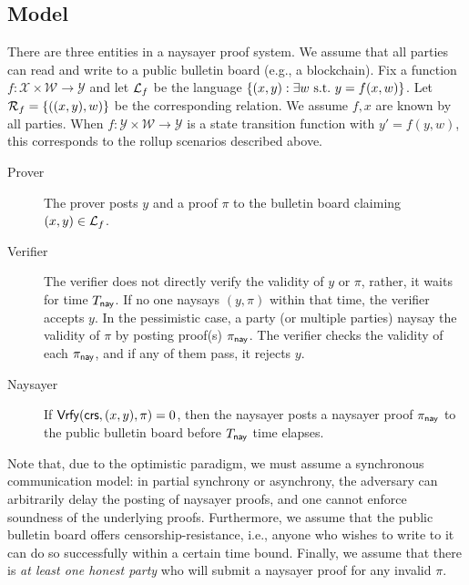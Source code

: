 \subsection{Model}\label{sec:naysayer_model}

There are three entities in a naysayer proof system. We assume that all parties can read and write to a public bulletin board (e.g., a blockchain). Fix a function $f: \mathcal{X} \times \mathcal{W} \to \mathcal{Y}$ and let $\mathcal{L}_f$ be the language $\{(x, y): \exists w \mathrm{~s.t.~} y = f(x, w)\}$. Let $\mathcal{R}_f = \{((x, y), w)\}$ be the corresponding relation. We assume $f,x$ are known by all parties. When $f : \mathcal{Y} \times \mathcal{W} \to \mathcal{Y}$ is a state transition function with $y' = f(y, w)$, this corresponds to the rollup scenarios described above.
\begin{description}
    \item[Prover] The prover posts $y$ and a proof $\pi$ to the bulletin board claiming $(x,y) \in \mathcal{L}_f$. 
    \item[Verifier] The verifier does not directly verify the validity of $y$ or $\pi$, rather, it waits for time $T_{\mathsf{nay}}$.
    If no one naysays $(y, \pi)$ within that time, the verifier accepts $y$. In the pessimistic case, a party (or multiple parties) naysay the validity of $\pi$ by posting proof(s) $\pi_{\mathsf{nay}}$. The verifier checks the validity of each $\pi_{\mathsf{nay}}$, and if any of them pass, it rejects $y$.
    \item[Naysayer] If $\mathsf{Vrfy}(\mathsf{crs}, (x,y),\pi)=0$, then the naysayer posts a naysayer proof $\pi_{\mathsf{nay}}$ to the public bulletin board before $T_{\mathsf{nay}}$ time elapses.
\end{description}

Note that, due to the optimistic paradigm, we must assume a synchronous communication model: in partial synchrony or asynchrony, the adversary can arbitrarily delay the posting of naysayer proofs, and one cannot enforce soundness of the underlying proofs. 
Furthermore, we assume that the public bulletin board offers censorship-resistance, i.e., anyone who wishes to write to it can do so successfully within a certain time bound. Finally, we assume that there is \emph{at least one honest party} who will submit a naysayer proof for any invalid $\pi$.